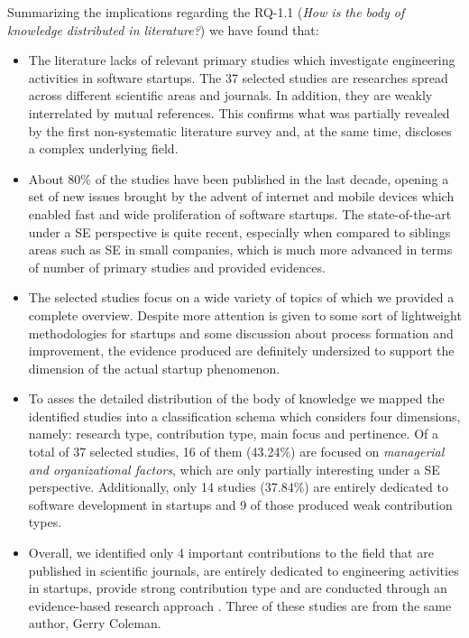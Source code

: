 \documentclass[final,5p,times,twocolumn]{elsarticle}
\begin{document}
Summarizing the implications regarding the RQ-1.1 (\textit{How is the body of knowledge distributed in literature?}) we have found that:


\begin{itemize}

\item The literature lacks of relevant primary studies which investigate engineering activities in software startups. The 37 selected studies are researches spread across different scientific areas and journals. In addition, they are weakly interrelated by mutual references. This confirms what was partially revealed by the first non-systematic literature survey and, at the same time, discloses a complex underlying field.
\item About 80\% of the studies have been published in the last decade, opening a set of new issues brought by the advent of internet and mobile devices which enabled fast and wide proliferation of software startups. The state-of-the-art under a SE perspective is quite recent,  especially when compared to siblings areas such as SE in small companies, which is much more advanced in terms of number of primary studies and provided evidences.
\item The selected studies focus on a wide variety of topics of which we provided a complete overview. Despite more attention is given to some sort of lightweight methodologies for startups and some discussion about process formation and improvement, the evidence produced are definitely undersized to support the dimension of the actual startup phenomenon.
\item To asses the detailed distribution of the body of knowledge we mapped the identified studies into a classification schema which considers four dimensions, namely: research type, contribution type, main focus and pertinence. Of a total of 37 selected studies, 16 of them (43.24\%) are focused on \textit{managerial and organizational factors}, which are only partially interesting under a SE perspective. Additionally, only 14 studies (37.84\%)  are entirely dedicated to software development in startups and 9 of those produced weak contribution types.
\item Overall, we identified only 4 important contributions to the field that are published in scientific journals, are entirely dedicated to engineering activities in startups, provide strong contribution type and are conducted through an evidence-based research approach \cite{Coleman2008,Coleman2008a,Coleman2007,Kajko-Mattsson2008}. Three of these studies are from the same author, Gerry Coleman.
\end{itemize}
\end{document}
